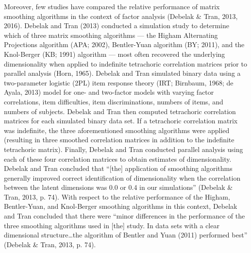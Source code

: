\documentclass[
  english,
  man]{apa6}
\begin{document}
Moreover, few studies have compared the relative performance of matrix smoothing algorithms in the context of factor analysis (Debelak \& Tran, 2013, 2016). Debelak and Tran (2013) conducted a simulation study to determine which of three matrix smoothing algorithms --- the Higham Alternating Projections algorithm (APA; 2002), Bentler-Yuan algorithm (BY; 2011), and the Knol-Berger (KB; 1991) algorithm --- most often recovered the underlying dimensionality when applied to indefinite tetrachoric correlation matrices prior to parallel analysis (Horn, 1965). Debelak and Tran simulated binary data using a two-parameter logistic (2PL) item response theory (IRT; Birnbaum, 1968; de Ayala, 2013) model for one- and two-factor models with varying factor correlations, item difficulties, item discriminations, numbers of items, and numbers of subjects. Debelak and Tran then computed tetrachoric correlation matrices for each simulated binary data set. If a tetrachoric correlation matrix was indefinite, the three aforementioned smoothing algorithms were applied (resulting in three smoothed correlation matrices in addition to the indefinite tetrachoric matrix). Finally, Debelak and Tran conducted parallel analysis using each of these four correlation matrices to obtain estimates of dimensionality. Debelak and Tran concluded that \enquote{{[}the{]} application of smoothing algorithms generally improved correct identification of dimensionality when the correlation between the latent dimensions was 0.0 or 0.4 in our simulations} (Debelak \& Tran, 2013, p. 74). With respect to the relative performance of the Higham, Bentler-Yuan, and Knol-Berger smoothing algorithms in this context, Debelak and Tran concluded that there were \enquote{minor differences in the performance of the three smoothing algorithms used in {[}the{]} study. In data sets with a clear dimensional structure\ldots the algorithm of Bentler and Yuan (2011) performed best} (Debelak \& Tran, 2013, p. 74).
\end{document}
